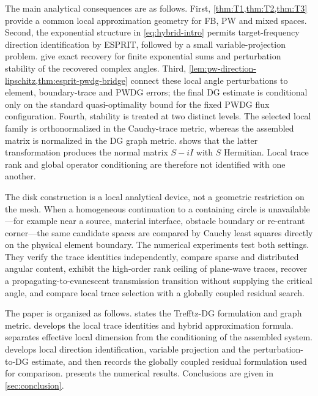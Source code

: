\documentclass[11pt]{article}
\newcommand{\ii}{i}
\numberwithin{equation}{section}
\begin{document}
The main analytical consequences are as follows.  First, \cref{thm:T1,thm:T2,thm:T3} provide a common local approximation geometry for FB, PW and mixed spaces.  Second, the exponential structure in \eqref{eq:hybrid-intro} permits target-frequency direction identification by ESPRIT, followed by a small variable-projection problem.   give exact recovery for finite exponential sums and perturbation stability of the recovered complex angles.  Third, \cref{lem:pw-direction-lipschitz,thm:esprit-pwdg-bridge} connect these local angle perturbations to element, boundary-trace and PWDG errors; the final DG estimate is conditional only on the standard quasi-optimality bound for the fixed PWDG flux configuration.  Fourth, stability is treated at two distinct levels.  The selected local family is orthonormalized in the Cauchy-trace metric, whereas the assembled matrix is normalized in the DG graph metric.   shows that the latter transformation produces the normal matrix $S-\ii I$ with $S$ Hermitian.  Local trace rank and global operator conditioning are therefore not identified with one another.

The disk construction is a local analytical device, not a geometric restriction on the mesh.  When a homogeneous continuation to a containing circle is unavailable---for example near a source, material interface, obstacle boundary or re-entrant corner---the same candidate spaces are compared by Cauchy least squares directly on the physical element boundary.  The numerical experiments test both settings.  They verify the trace identities independently, compare sparse and distributed angular content, exhibit the high-order rank ceiling of plane-wave traces, recover a propagating-to-evanescent transmission transition without supplying the critical angle, and compare local trace selection with a globally coupled residual search.

The paper is organized as follows.   states the Trefftz-DG formulation and graph metric.   develops the local trace identities and hybrid approximation formula.   separates effective local dimension from the conditioning of the assembled system.   develops local direction identification, variable projection and the perturbation-to-DG estimate, and then records the globally coupled residual formulation used for comparison.   presents the numerical results.  Conclusions are given in \cref{sec:conclusion}.
\end{document}

